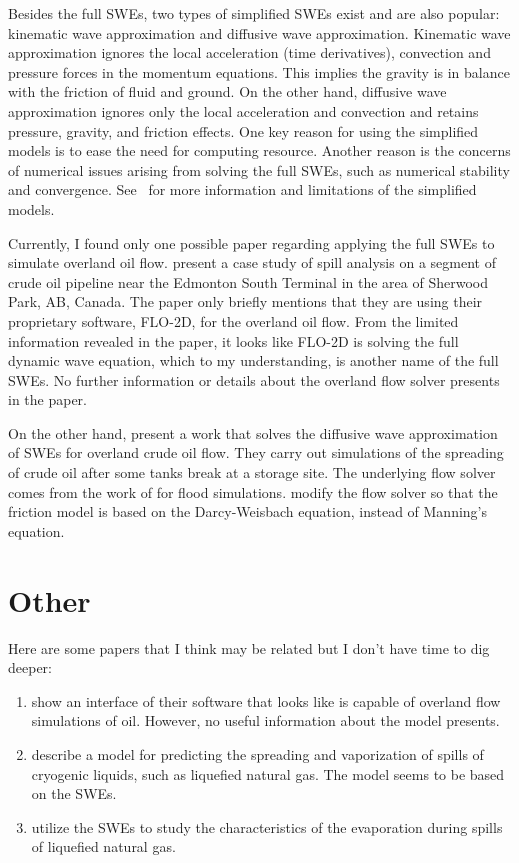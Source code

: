 \documentclass[letterpaper]{article}
\begin{document}
Besides the full SWEs, two types of simplified SWEs exist and are also popular:
kinematic wave approximation and diffusive wave approximation.
Kinematic wave approximation ignores the local acceleration (time derivatives), 
convection and pressure forces in the momentum equations.
This implies the gravity is in balance with the friction of fluid and ground.
On the other hand, diffusive wave approximation ignores only the local 
acceleration and convection and retains pressure, gravity, and friction effects.
One key reason for using the simplified models is to ease the need for computing 
resource.
Another reason is the concerns of numerical issues arising from solving the
full SWEs, such as numerical stability and convergence. 
See\ \cite{HEC-11993, Kazezyilmaz-Alhan2012} for more information and 
limitations of the simplified models.

Currently, I found only one possible paper regarding applying the full SWEs to 
simulate overland oil flow.
\textcite{Gin2012} present a case study of spill analysis on a 
segment of crude oil pipeline near the Edmonton South Terminal in the area of 
Sherwood Park, AB, Canada. 
The paper only briefly mentions that they are using their proprietary 
software, FLO-2D, for the overland oil flow. 
From the limited information revealed in the paper, it looks like FLO-2D is 
solving the full dynamic wave equation, which to my understanding, is another
name of the full SWEs.
No further information or details about the overland flow solver presents in the
paper. 

On the other hand, \textcite{Su2017} present a work that solves the diffusive
wave approximation of SWEs for overland crude oil flow.
They carry out simulations of the spreading of crude oil after some tanks break 
at a storage site. 
The underlying flow solver comes from the work of \textcite{Bates2000} for flood 
simulations.
\textcite{Su2017} modify the flow solver so that the friction model is based
on the Darcy-Weisbach equation, instead of Manning's equation.


\section{Other}

Here are some papers that I think may be related but I don't have time to dig
deeper:

\begin{enumerate}[noitemsep]
    \item \textcite{Paige2002} show an interface of their software that looks
        like is capable of overland flow simulations of oil. However, no useful
        information about the model presents.
    \item \textcite{Linden1998} describe a model for predicting the spreading
        and vaporization of spills of cryogenic liquids, such as liquefied 
        natural gas. The model seems to be based on the SWEs.
    \item \textcite{Ponchaut2011} utilize the SWEs to study the characteristics
        of the evaporation during spills of liquefied natural gas.
\end{enumerate}


\printbibliography
\end{document}
